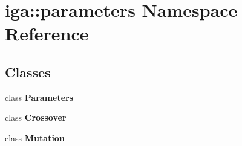 \section{iga::parameters Namespace Reference}
\label{namespaceiga_1_1parameters}


\subsection*{Classes}
\begin{CompactItemize}
\item 
class {\bf Parameters}
\item 
class {\bf Crossover}
\item 
class {\bf Mutation}
\end{CompactItemize}
